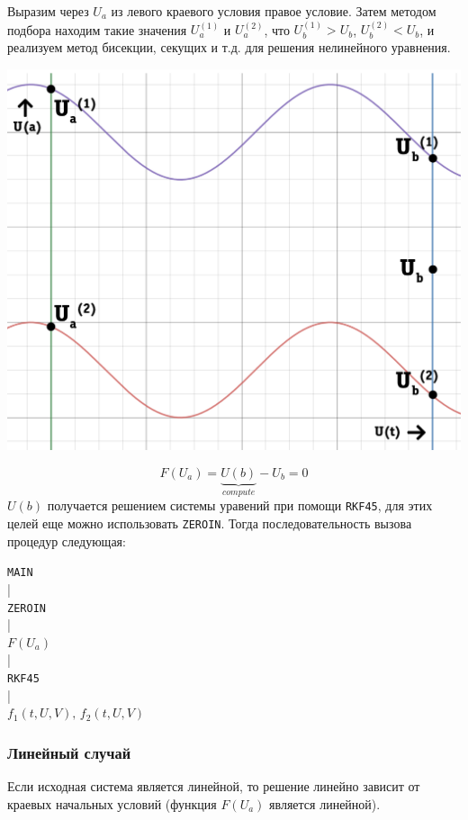 \documentclass[a4paper,11pt]{article}
\begin{document}
\noindent Выразим через $U_a$ из левого краевого условия правое условие. Затем методом подбора находим такие значения $U_a^{(1)}$ и $U_a^{(2)}$,
      что $U_b^{(1)} > U_b$, $U_b^{(2)} < U_b$, и реализуем метод бисекции, секущих и т.д. для решения нелинейного уравнения.
\begin{center}
  \includegraphics[scale=0.21]{img3.png} \\
\end{center}
\begin{equation*}
  F(U_a) = \underbrace{U(b)}_{compute} - U_b = 0
\end{equation*}
$U(b)$ получается решением системы уравений при помощи \verb|RKF45|, для этих целей еще можно использовать \verb|ZEROIN|.
      Тогда последовательность вызова процедур следующая:

\begin{center}
  \verb|MAIN| \\
  | \\
  \verb|ZEROIN| \\
  | \\
  $F(U_a)$ \\
  | \\
  \verb|RKF45| \\
  | \\
  $f_1(t,U,V), \, f_2(t, U, V)$
\end{center}
\subsubsection{Линейный случай}
\noindent Если исходная система является линейной, то решение линейно зависит от краевых начальных условий
      (функция $F(U_a)$ является линейной). \\
\end{document}
